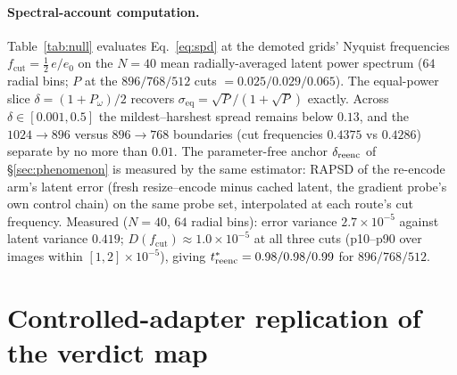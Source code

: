 \paragraph{Spectral-account computation.} Table~\ref{tab:null} evaluates
Eq.~\ref{eq:spd} at the demoted grids' Nyquist frequencies
$f_{\mathrm{cut}} = \tfrac{1}{2}\,e/e_0$ on the $N{=}40$
mean radially-averaged latent power spectrum ($64$ radial bins; $P$ at
the $896/768/512$ cuts $= 0.025/0.029/0.065$). The equal-power slice
$\delta = (1+P_\omega)/2$ recovers
$\sigma_{\mathrm{eq}} = \sqrt{P}/(1+\sqrt{P})$ exactly. Across
$\delta \in [0.001, 0.5]$ the mildest--harshest spread remains below
$0.13$, and the $1024{\to}896$ versus $896{\to}768$ boundaries (cut
frequencies $0.4375$ vs $0.4286$) separate by no more than $0.01$.
The parameter-free anchor $\delta_{\mathrm{reenc}}$ of \S\ref{sec:phenomenon} is
measured by the same estimator: RAPSD of the re-encode arm's latent error
(fresh resize--encode minus cached latent, the gradient probe's own
control chain) on the same probe set, interpolated at each route's cut
frequency. Measured ($N{=}40$, $64$ radial bins): error variance
$2.7\times10^{-5}$ against latent variance $0.419$;
$D(f_{\mathrm{cut}}) \approx 1.0\times10^{-5}$ at all three cuts
(p10--p90 over images within $[1, 2]\times10^{-5}$), giving
$t^{*}_{\mathrm{reenc}} = 0.98 / 0.98 / 0.99$ for $896/768/512$.

\section{Controlled-adapter replication of the verdict map}
\label{app:e7}

